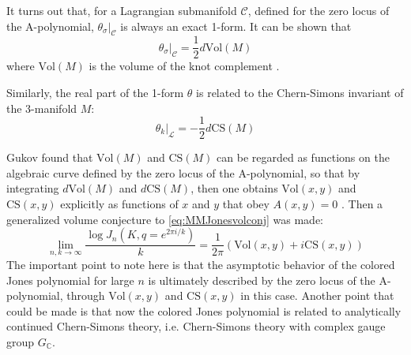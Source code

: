 \documentclass[a4paper,titlepage,twoside]{book}
\begin{document}
It turns out that, for a Lagrangian submanifold $\mathcal{C}$, defined for the zero locus of the A-polynomial, $\left. \theta_{\sigma} \right|_{ \mathcal{C}}$ is always an exact 1-form.  It can be shown that 
\begin{equation}
  \left. \theta_{\sigma} \right|_{\mathcal{C}} = \frac{1}{2} d\text{Vol}{ (M)}
\end{equation}
where $\text{Vol}{(M)}$ is the volume of the knot complement \cite{Gukov2005}.  

Similarly, the real part of the 1-form $\theta$ is related to the Chern-Simons invariant of the 3-manifold $M$:
\begin{equation}
\left. \theta_k \right|_{ \mathcal{L}} = - \frac{1}{2} d \text{CS}{ (M)}
\end{equation}

Gukov found that $\text{Vol}{(M)}$ and $\text{CS}{(M)}$ can be regarded as functions on the algebraic curve defined by the zero locus of the A-polynomial, so that by integrating $d\text{Vol}{(M)}$ and $d\text{CS}{(M)}$, then one obtains $\text{Vol}{(x,y)}$ and $\text{CS}{(x,y)}$ explicitly as functions of $x$ and $y$ that obey $A(x,y)=0$ \cite{Gukov2005}.  Then a generalized volume conjecture to \eqref{eq:MMJonesvolconj} was made:
\begin{equation}
  \lim_{n,k \to \infty} \frac{ \log{ J_n{ (K, q = e^{2\pi i/k } )} } }{ k } =\frac{1}{2 \pi } ( \text{Vol}{ (x,y)} + i  \text{CS}{(x,y)} )
\end{equation}
The important point to note here is that the asymptotic behavior of the colored Jones polynomial for large $n$ is ultimately described by the zero locus of the A-polynomial, through $\text{Vol}{(x,y)}$ and $\text{CS}{(x,y)}$ in this case.  Another point that could be made is that now the colored Jones polynomial is related to analytically continued Chern-Simons theory, i.e. Chern-Simons theory with complex gauge group $G_{\mathbb{C}}$.

\end{document}
